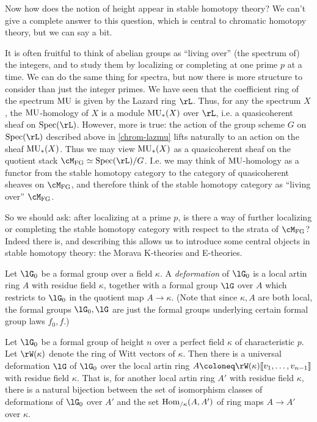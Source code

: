 Now how does the notion of height appear in stable homotopy theory? We
can't give a complete answer to this question, which is central to
chromatic homotopy theory, but we can say a bit.

It is often fruitful to think of abelian groups as ``living over''
(the spectrum of) the integers, and to study them by localizing or
completing at one prime $p$ at a time. We can do the same thing for
spectra, but now there is more structure to consider than just the
integer primes. We have seen that the coefficient ring of the spectrum
$\mathrm{MU}$ is given by the Lazard ring $\rL$. Thus, for any the spectrum
$X$, the $\mathrm{MU}$-homology of $X$ is a module $\mathrm{MU}_*(X)$ over $\rL$,
i.e. a quasicoherent sheaf on $\Spec(\rL)$. However, more is true: the
action of the group scheme $G$ on $\Spec(\rL)$ described above in
\cref{chrom-lazmu} lifts naturally to an action on the sheaf
$\mathrm{MU}_*(X)$. Thus we may view $\mathrm{MU}_*(X)$ as a quasicoherent sheaf on
the quotient stack $\cM_\FG \iso \Spec(\rL) / G$. I.e. we may think of
$\mathrm{MU}$-homology as a functor from the stable homotopy category to the
category of quasicoherent sheaves on $\cM_\FG$, and therefore think of
the stable homotopy category as ``living over'' $\cM_\FG$.

So we should ask: after localizing at a prime $p$, is there a way of
further localizing or completing the stable homotopy category with
respect to the strata of $\cM_\FG$? Indeed there is, and describing
this allows us to introduce some central objects in stable homotopy
theory: the Morava K-theories and E-theories.

\begin{definition}
  \label{chrom-def}
  Let $\lG_0$ be a formal group over a field $\kappa$. A
  \emph{deformation} of $\lG_0$ is a local artin ring $A$ with residue
  field $\kappa$, together with a formal group $\lG$ over $A$ which
  restricts to $\lG_0$ in the quotient map $A \to \kappa$. (Note that
  since $\kappa, A$ are both local, the formal groups $\lG_0,\lG$ are
  just the formal groups underlying certain formal group laws
  $f_0,f$.)
\end{definition}

\begin{proposition}
  \label{chrom-univdef}
  Let $\lG_0$ be a formal group of height $n$ over a perfect field
  $\kappa$ of characteristic $p$. Let $\rW(\kappa)$ denote the ring of
  Witt vectors of $\kappa$. Then there is a universal deformation
  $\lG$ of $\lG_0$ over the local artin ring
  $A \ce \rW(\kappa) \ldb v_1, \ldots, v_{n-1} \rdb$ with residue
  field $\kappa$. That is, for another local artin ring $A'$ with
  residue field $\kappa$, there is a natural bijection between the set
  of isomorphism classes of deformations of $\lG_0$ over $A'$ and the
  set $\operatorname{Hom}_{/\kappa}(A,A')$ of ring maps $A \to A'$ over $\kappa$.
\end{proposition}

